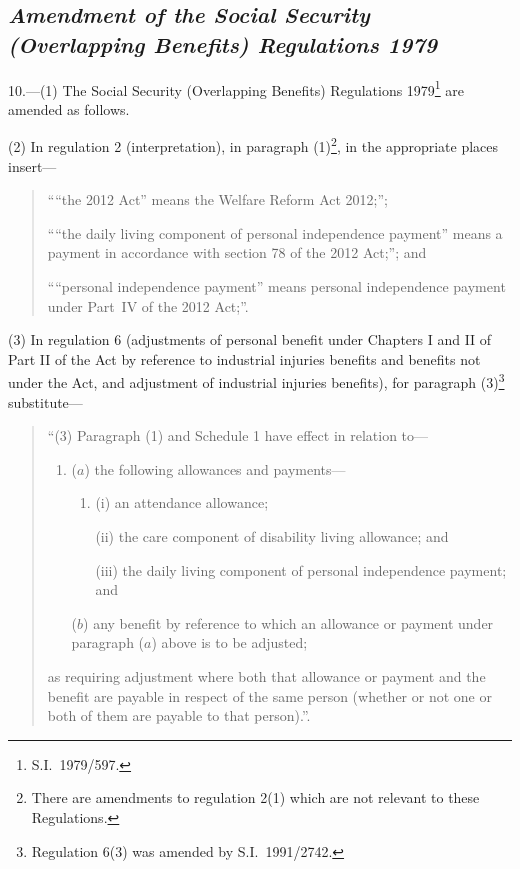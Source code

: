 \documentclass[12pt,a4paper]{article}
\begin{document}
\subsection*{\itshape Amendment of the Social Security (Overlapping Benefits) Regulations 1979}

10.—(1) The Social Security (Overlapping Benefits) Regulations 1979\footnote{S.I.~1979/597.} are amended as follows.

(2) In regulation 2 (interpretation), in paragraph (1)\footnote{There are amendments to regulation 2(1) which are not relevant to these Regulations.}, in the appropriate places insert—
\begin{quotation}
““the 2012 Act” means the Welfare Reform Act 2012;”;

““the daily living component of personal independence payment” means a payment in accordance with section 78 of the 2012 Act;”; and

““personal independence payment” means personal independence payment under Part~IV of the 2012 Act;”.
\end{quotation}

(3) In regulation 6 (adjustments of personal benefit under Chapters I and II of Part II of the Act by reference to industrial injuries benefits and benefits not under the Act, and adjustment of industrial injuries benefits), for paragraph (3)\footnote{Regulation 6(3) was amended by S.I.~1991/2742.} substitute—
\begin{quotation}
“(3) Paragraph (1) and Schedule 1 have effect in relation to—
\begin{enumerate}\item[]
($a$) the following allowances and payments—
\begin{enumerate}\item[]
(i) an attendance allowance;

(ii) the care component of disability living allowance; and

(iii) the daily living component of personal independence payment; and
\end{enumerate}

($b$) any benefit by reference to which an allowance or payment under paragraph ($a$)  above is to be adjusted;
\end{enumerate}
as requiring adjustment where both that allowance or payment and the benefit are payable in respect of the same person (whether or not one or both of them are payable to that person).”.
\end{quotation}
\end{document}
